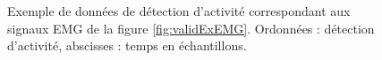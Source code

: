 \documentclass[letterpaper, twoside, 12pt, memoire, creativecommons, hyperref]{thETS}
\begin{document}
\begin{figure}
	\centering
	\caption{Exemple de données de détection d'activité correspondant aux signaux EMG de la figure \ref{fig:validExEMG}. Ordonnées : détection d'activité, abscisses : temps en échantillons.}
	\label{fig:validExOnset}
\end{figure}

\end{document}
